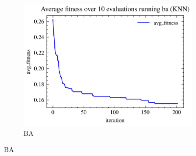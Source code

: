 \begin{figure}[H]
\begin{subfigure}[b]{0.3\textwidth}
        \centering
        \includegraphics[width=\textwidth]{imagenes/binary_knn_fitness/KNN_fitness_over_10_evaluations_ba_binary_breast-cancer.jpg}
        \caption{BA}
        \label{fig:sub3}
    \end{subfigure}


\end{figure}
